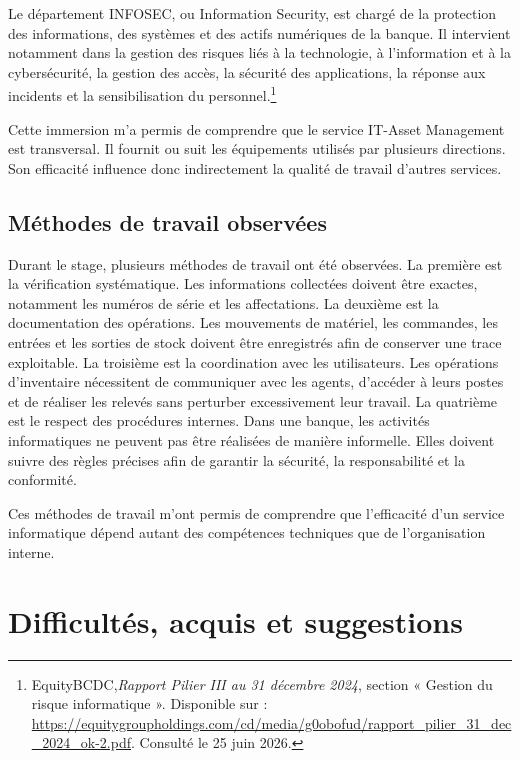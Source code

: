 \documentclass[12pt,a4paper]{report}
\begin{document}
Le département INFOSEC, ou Information Security, est chargé de la protection
des informations, des systèmes et des actifs numériques de la banque. Il intervient notamment dans la gestion des risques liés à la technologie, à l'information et à la cybersécurité, la gestion des accès, la sécurité des applications, la réponse aux incidents et la sensibilisation du personnel.\footnote{EquityBCDC,\textit{Rapport Pilier III au 31 décembre 2024}, section « Gestion du risque informatique ».
Disponible sur : \url{https://equitygroupholdings.com/cd/media/g0obofud/rapport_pilier_31_dec_2024_ok-2.pdf}. Consulté le 25 juin 2026.}

Cette immersion m'a permis de comprendre que le service IT-Asset Management est transversal. Il fournit ou suit les équipements utilisés par plusieurs directions. Son efficacité influence donc indirectement la qualité de travail d'autres services.

\section{Méthodes de travail observées}

Durant le stage, plusieurs méthodes de travail ont été observées.
La première est la vérification systématique. Les informations collectées doivent être exactes, notamment les numéros de série et les affectations.
La deuxième est la documentation des opérations. Les mouvements de matériel, les commandes, les entrées et les sorties de stock doivent être enregistrés afin de conserver une trace exploitable.
La troisième est la coordination avec les utilisateurs. Les opérations d'inventaire nécessitent de communiquer avec les agents, d'accéder à leurs postes et de réaliser les relevés sans perturber excessivement leur travail.
La quatrième est le respect des procédures internes. Dans une banque, les activités informatiques ne peuvent pas être réalisées de manière informelle. Elles doivent suivre des règles précises afin de garantir la sécurité, la responsabilité et la conformité.

Ces méthodes de travail m'ont permis de comprendre que l'efficacité d'un service informatique dépend autant des compétences techniques que de l'organisation interne.

\chapter{Difficultés, acquis et suggestions}
\end{document}
